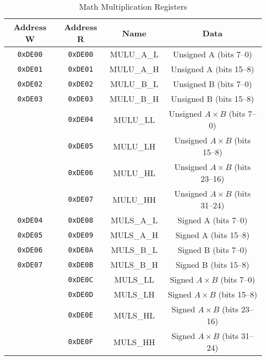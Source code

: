 \begin{table}[ht]
    \begin{center}
        \begin{tabular}{|c|c|c|c|} \hline
            Address W & Address R & Name & Data \\\hline\hline
            \verb+0xDE00+ & \verb+0xDE00+ & MULU\_A\_L & Unsigned A (bits 7--0) \\ \hline
            \verb+0xDE01+ & \verb+0xDE01+ & MULU\_A\_H & Unsigned A (bits 15--8) \\ \hline
            \verb+0xDE02+ & \verb+0xDE02+ & MULU\_B\_L & Unsigned B (bits 7--0) \\ \hline
            \verb+0xDE03+ & \verb+0xDE03+ & MULU\_B\_H & Unsigned B (bits 15--8) \\ \hline
                          & \verb+0xDE04+ & MULU\_LL & Unsigned $A \times B$  (bits 7--0) \\ \hline
                          & \verb+0xDE05+ & MULU\_LH & Unsigned $A \times B$  (bits 15--8) \\ \hline
                          & \verb+0xDE06+ & MULU\_HL & Unsigned $A \times B$  (bits 23--16) \\ \hline
                          & \verb+0xDE07+ & MULU\_HH & Unsigned $A \times B$  (bits 31--24) \\ \hline\hline

            \verb+0xDE04+ & \verb+0xDE08+ & MULS\_A\_L & Signed A (bits 7--0) \\ \hline
            \verb+0xDE05+ & \verb+0xDE09+ & MULS\_A\_H & Signed A (bits 15--8) \\ \hline
            \verb+0xDE06+ & \verb+0xDE0A+ & MULS\_B\_L & Signed B (bits 7--0) \\ \hline
            \verb+0xDE07+ & \verb+0xDE0B+ & MULS\_B\_H & Signed B (bits 15--8) \\ \hline
                          & \verb+0xDE0C+ & MULS\_LL & Signed $A \times B$  (bits 7--0) \\ \hline
                          & \verb+0xDE0D+ & MULS\_LH & Signed $A \times B$  (bits 15--8) \\ \hline
                          & \verb+0xDE0E+ & MULS\_HL & Signed $A \times B$  (bits 23--16) \\ \hline
                          & \verb+0xDE0F+ & MULS\_HH & Signed $A \times B$  (bits 31--24) \\ \hline
        \end{tabular}
    \end{center}
    \caption{Math Multiplication Registers}
    \label{tab:math_mult_reg}
\end{table}

